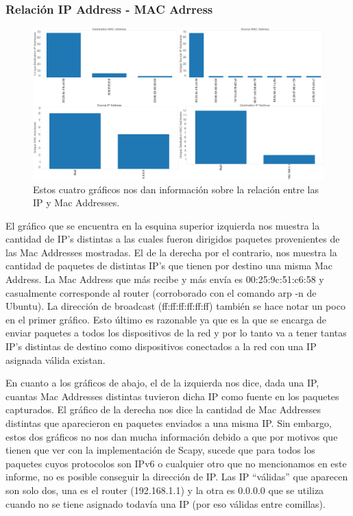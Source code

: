 \documentclass{article}
\theoremstyle{definition}
\theoremstyle{remark}
\begin{document}
\subsubsection{Relación IP Address - MAC Adrress}
\begin{figure}[H]
    \centering
    \includegraphics[width=1\textwidth]{../captures/CasaGerman/IP vs MAC Correspondence.png}
    \caption{Estos cuatro gráficos nos dan información sobre la relación entre las IP y Mac Addresses.}
    \label{fig:mesh1}
\end{figure}

El gráfico que se encuentra en la esquina superior izquierda nos muestra la cantidad de IP's distintas a las cuales fueron dirigidos paquetes provenientes de las Mac Addresses mostradas. El de la derecha por el contrario, nos muestra la cantidad de paquetes de distintas IP's que tienen por destino una misma Mac Address. La Mac Address que más recibe y más envía es 00:25:9c:51:c6:58 y casualmente corresponde al router (corroborado con el comando arp -n de Ubuntu). La dirección de broadcast (ff:ff:ff:ff:ff:ff) también se hace notar un poco en el primer gráfico. Esto último es razonable ya que es la que se encarga de enviar paquetes a todos los dispositivos de la red y por lo tanto va a tener tantas IP's distintas de destino como dispositivos conectados a la red con una IP asignada válida existan.

En cuanto a los gráficos de abajo, el de la izquierda nos dice, dada una IP, cuantas Mac Addresses distintas tuvieron dicha IP como fuente en los paquetes capturados. El gráfico de la derecha nos dice la cantidad de Mac Addresses distintas que aparecieron en paquetes enviados a una misma IP. Sin embargo, estos dos gráficos no nos dan mucha información debido a que por motivos que tienen que ver con la implementación de Scapy, sucede que para todos los paquetes cuyos protocolos son IPv6 o cualquier otro que no mencionamos en este informe, no es posible conseguir la dirección de IP. Las IP ``válidas'' que aparecen son solo dos, una es el router (192.168.1.1) y la otra es 0.0.0.0 que se utiliza cuando no se tiene asignado todavía una IP (por eso válidas entre comillas).
\end{document}

